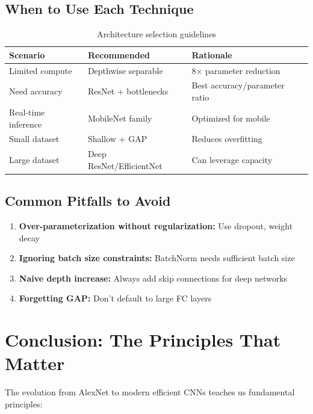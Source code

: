 \documentclass{article}
\begin{document}
\subsection{When to Use Each Technique}

\begin{table}[h]
\centering
\begin{tabular}{|l|l|l|}
\hline
\textbf{Scenario} & \textbf{Recommended} & \textbf{Rationale} \\
\hline
Limited compute & Depthwise separable & 8× parameter reduction \\
Need accuracy & ResNet + bottlenecks & Best accuracy/parameter ratio \\
Real-time inference & MobileNet family & Optimized for mobile \\
Small dataset & Shallow + GAP & Reduces overfitting \\
Large dataset & Deep ResNet/EfficientNet & Can leverage capacity \\
\hline
\end{tabular}
\caption{Architecture selection guidelines}
\end{table}

\subsection{Common Pitfalls to Avoid}

\begin{enumerate}
    \item \textbf{Over-parameterization without regularization:} Use dropout, weight decay
    \item \textbf{Ignoring batch size constraints:} BatchNorm needs sufficient batch size
    \item \textbf{Naive depth increase:} Always add skip connections for deep networks
    \item \textbf{Forgetting GAP:} Don't default to large FC layers
\end{enumerate}

\section{Conclusion: The Principles That Matter}

The evolution from AlexNet to modern efficient CNNs teaches us fundamental principles:
\end{document}
